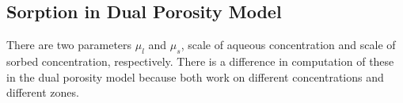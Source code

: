 % 
% 


\subsection{Sorption in Dual Porosity Model} 
\label{subsec:sorp_dual_por}
There are two parameters $\mu_l$ and $\mu_s$, scale of aqueous concentration and scale of sorbed concentration, respectively.  
There is a difference in computation of these in the dual porosity model because both work on different concentrations
and different zones.

